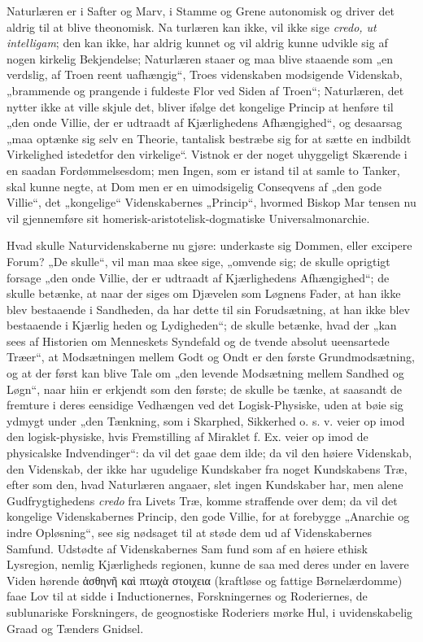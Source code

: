 \documentclass[12pt]{book}
\newcommand{\opage}[1]{\marginnote{\footnotesize\textit{[#1]}}}
\begin{document}
Naturlæren er i Safter og Marv, i Stamme og Grene
autonomisk og driver det aldrig til at blive theonomisk. Na\-%
turlæren kan ikke, vil ikke sige \textit{credo, ut intelligam}; den kan
ikke, har aldrig kunnet og vil aldrig kunne udvikle sig af
nogen kirkelig Bekjendelse; Naturlæren staaer og maa blive
staaende som „en verdslig, af Troen reent uafhængig“, Troes\-%
videnskaben modsigende Videnskab, „brammende og prangende
i fuldeste Flor ved Siden af Troen“; Naturlæren, det nytter
ikke at ville skjule det, bliver ifølge det kongelige Princip at
henføre til „den onde Villie, der er udtraadt af Kjærlighedens
Afhængighed“, og desaarsag „maa optænke sig selv en Theorie,
tantalisk bestræbe sig for at sætte en indbildt Virkelighed
\opage{15}\setcounter{footnote}{0}%
istedetfor den virkelige“. Vistnok er der noget uhyggeligt
Skærende i en saadan Fordømmelsesdom; men Ingen, som
er istand til at samle to Tanker, skal kunne negte, at Dom\-%
men er en uimodsigelig Conseqvens af „den gode Villie“, det
„kongelige“ Videnskabernes „Princip“, hvormed Biskop Mar\-%
tensen nu vil gjennemføre sit homerisk-aristotelisk-dogmatiske
Universalmonarchie.

Hvad skulle Naturvidenskaberne nu gjøre: underkaste sig
Dommen, eller excipere Forum? „De skulle“, vil man maa\-%
skee sige, „omvende sig; de skulle oprigtigt forsage „den onde
Villie, der er udtraadt af Kjærlighedens Afhængighed“; de
skulle betænke, at naar der siges om Djævelen som Løgnens
Fader, at han ikke blev bestaaende i Sandheden, da har dette
til sin Forudsætning, at han ikke blev bestaaende i Kjærlig\-%
heden og Lydigheden“; de skulle betænke, hvad der „kan sees
af Historien om Menneskets Syndefald og de tvende absolut
ueensartede Træer“, at Modsætningen mellem Godt og Ondt
er den første Grundmodsætning, og at der først kan blive
Tale om „den levende Modsætning mellem Sandhed og
Løgn“, naar hiin er erkjendt som den første; de skulle be\-%
tænke, at saasandt de fremture i deres eensidige Vedhængen
ved det Logisk-Physiske, uden at bøie sig ydmygt under „den
Tænkning, som i Skarphed, Sikkerhed o. s. v. veier op imod
den logisk-physiske, hvis Fremstilling af Miraklet f. Ex. veier
op imod de physicalske Indvendinger“: da vil det gaae dem
ilde; da vil den høiere Videnskab, den Videnskab, der ikke
har ugudelige Kundskaber fra noget Kundskabens Træ, efter\-%
som den, hvad Naturlæren angaaer, slet ingen Kundskaber
har, men alene Gudfrygtighedens \textit{credo} fra Livets Træ,
komme straffende over dem; da vil det kongelige Videnskabernes
Princip, den gode Villie, for at forebygge „Anarchie og
indre Opløsning“, see sig nødsaget til at støde dem ud af
Videnskabernes Samfund. Udstødte af Videnskabernes Sam\-%
fund som af en høiere ethisk Lysregion, nemlig Kjærligheds\-%
\opage{16}\setcounter{footnote}{0}%
regionen, kunne de saa med deres under en lavere Viden
hørende ἀσθηνῆ καὶ πτωχὰ στοιχεια %
(kraftløse og fattige
Børnelærdomme) faae Lov til at sidde i Inductionernes,
Forskningernes og Roderiernes, de sublunariske Forskningers,
de geognostiske Roderiers mørke Hul, i uvidenskabelig Graad
og Tænders Gnidsel.
\end{document}
